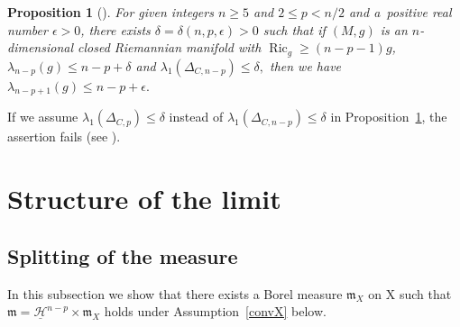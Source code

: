 \documentclass[10pt,a4paper]{amsart}
\numberwithin{equation}{section}
\newtheorem{Thm}{Theorem}[section]
\newtheorem{Prop}[Thm]{Proposition}
\theoremstyle{definition}
\newcommand{\Ric}{\operatorname{Ric}}
\newcommand{\mf}{\mathfrak{m}}
\newcommand{\nHa}{\underline{\mathcal{H}}}
\begin{document}
\begin{Prop}[{\cite[Corollary~4.53]{Ai3}}]\label{impr}
For given integers $n\geq 5$ and $2\leq p < n/2$ and a~positive real number $\epsilon>0$, there exists $\delta=\delta(n,p,\epsilon)>0$ such that if $(M,g)$ is an $n$-dimensional closed Riemannian manifold with $\Ric_g\geq (n-p-1)g$,
$\lambda_{n-p}(g)\leq n-p+\delta$
and
$\lambda_1(\Delta_{C,n-p})\leq \delta,$
then we have
$
\lambda_{n-p+1}(g)\leq n-p+\epsilon.
$
\end{Prop}
If we assume $\lambda_1(\Delta_{C,p})\leq \delta$ instead of $\lambda_1(\Delta_{C,n-p})\leq \delta$ in Proposition~\ref{impr}, the assertion fails (see \cite[Corollary~3.2 and~Proposition~3.3]{Ai3}).

\section{Structure of the limit}
\subsection{Splitting of the measure}
In this subsection we show that there exists a Borel measure $\mf_X$ on X such that $\mf=\nHa^{n-p}\times \mf_X$ holds under Assumption~\ref{convX} below.
\end{document}
